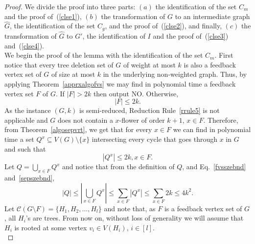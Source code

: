 \documentclass[a4paper,11pt]{article}
\newcommand{\cc}{{\mathcal{C}}}
\begin{document}
\begin{proof} We divide the proof into three parts: $(a)$ the identification of the set $C_{m}$ and the proof of~(\ref{clse1}), $(b)$ the transformation of $G$ to an 
intermediate graph $\widehat{G}$, the identification of the set $C_{g}$, and the proof of~(\ref{clse2}), 
and finally, $(c)$ the transformation of $\widehat{G}$ to $G'$, the identification of $I$ and the proof of~(\ref{clse3}) and~(\ref{clse4}).\\

We begin the proof of the lemma with the identification of the set $C_{m}$. 
First notice that every tree deletion set of $G$ of weight at most $k$ is also a feedback vertex set of $G$ of size at most $k$ in the underlying non-weighted graph. Thus, by applying Theorem~\ref{apprxalgofvs} we may find 
in polynomial time a feedback vertex set $F$ of $G$. If $|F|> 2k$ then output NO. Otherwise,
\begin{equation}
 |F|\leq 2k.\label{fvsszebnd}
 \end{equation} 
\noindent As the instance $(G,k)$ is semi-reduced, Reduction Rule~\ref{rrule5} is not applicable and $G$ does not contain a $x$-flower of order $k+1$, $x\in F$.
 Therefore, from Theorem~\ref{algosepvrt}, we get that for every $x\in F$ we can find in polynomial time a set $Q^{x}\subseteq V(G)\setminus \{x\}$ intersecting 
 every cycle that goes through $x$ in $G$ and such that 
\begin{equation} |Q^{x}|\leq 2k, x\in F.\label{sepszebnd}\end{equation}
Let $\displaystyle Q=\bigcup_{x\in F} Q^{x}$ and notice that from the definition of $Q$, and Eq.~\eqref{fvsszebnd} and~\eqref{sepszebnd}, 
\begin{equation}
\displaystyle \left|Q\right|\leq \left|\bigcup_{x\in F} Q^{x}\right| \leq\sum_{x\in F}\left|Q^{x}\right|\leq \sum_{x\in F}2k  \leq 4k^{2}.\label{qszebnd}
\end{equation}
Let $\cc(G\setminus F)=\{H_{1},H_{2},\dots, H_{l}\}$ and note that, as $F$ is a feedback vertex set of $G$, all $H_{i}$'s are trees. 
 From now on, without loss of generality we will assume that $H_{i}$ is rooted at some vertex $v_{i}\in V(H_{i})$, $i\in [l]$.\\


\end{proof}
\end{document}
